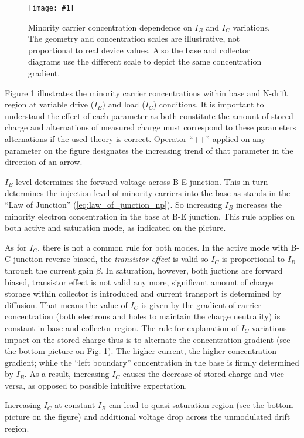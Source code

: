 \documentclass[conference]{IEEEtran}
\newcommand{\myfig}[3]
{
    \begin{figure}[!ht]
	\centering
	\texttt{[image: \#1]}
	\caption{#2}
	#3
    \end{figure}
}
\begin{document}
\myfig{rezimy2}{Minority carrier concentration dependence on $I_B$ and $I_C$ variations. The geometry and concentration scales are illustrative, not proportional to real device values. Also the base and collector diagrams use the different scale to depict the same concentration gradient.}{\label{fig:rezimy2}}

Figure \ref{fig:rezimy2} illustrates the minority carrier concentrations within base and N-drift region at variable drive ($I_B$) and load ($I_C$) conditions. It is important to understand the effect of each parameter as both constitute the amount of stored charge and alternations of measured charge must correspond to these parameters alternations if the used theory is correct. Operator ``++'' applied on any parameter on the figure designates the increasing trend of that parameter in the direction of an arrow.

$I_B$ level determines the forward voltage across B-E junction. This in turn determines the injection level of minority carriers into the base as stands in the ``Law of Junction'' (\ref{eq:law_of_junction_np}).
So increasing $I_B$ increases the minority electron concentration in the base at B-E junction. This rule applies on both active and saturation mode, as indicated on the picture.

As for $I_C$, there is not a common rule for both modes.
In the active mode with B-C junction reverse biased, the \textit{transistor effect} is valid so $I_C$ is proportional to $I_B$ through the current gain $\beta$.
In saturation, however, both juctions are forward biased, transistor effect is not valid any more, significant amount of charge storage within collector is introduced and current transport is determined by diffusion. That means the value of $I_C$ is given by the gradient of carrier concentration (both electrons and holes to maintain the charge neutrality) is constant in base and collector region.
The rule for explanation of $I_C$ variations impact on the stored charge thus is to alternate the concentration gradient (see the bottom picture on Fig. \ref{fig:rezimy2}). The higher current, the higher concentration gradient; while the ``left boundary'' concentration in the base is firmly determined by $I_B$. As a result, increasing $I_C$ causes the decrease of stored charge and vice versa, as opposed to possible intuitive expectation.

Increasing $I_C$ at constant $I_B$ can lead to quasi-saturation region (see the bottom picture on the figure) and additional voltage drop across the unmodulated drift region.
\end{document}
